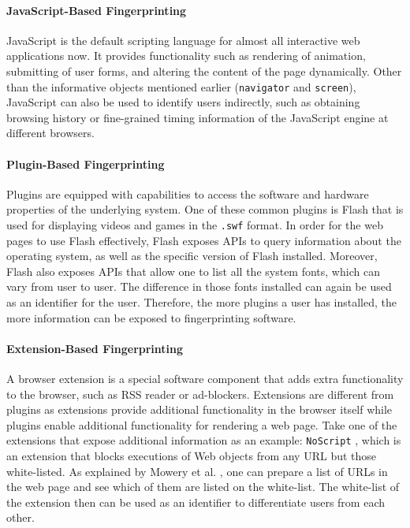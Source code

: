 \documentclass{acm_proc_article-sp}
\begin{document}
\paragraph{JavaScript-Based Fingerprinting}
JavaScript is the default scripting language for almost all interactive web applications now. It provides functionality such as rendering of animation, submitting of user forms, and altering the content of the page dynamically. 
Other than the informative objects mentioned earlier (\verb|navigator| and \verb|screen|), JavaScript can also be used to identify users indirectly, such as obtaining browsing history or fine-grained timing information of the JavaScript engine at different browsers.

\paragraph{Plugin-Based Fingerprinting}
Plugins are equipped with capabilities to access the software and hardware properties of the underlying system. One of these common plugins is Flash that is used for displaying videos and games in the \verb|.swf| format. In order for the web pages to use Flash effectively, Flash exposes APIs to query information about the operating system, as well as the specific version of Flash installed.
Moreover, Flash also exposes APIs that allow one to list all the system fonts, which can vary from user to user. The difference in those fonts installed can again be used as an identifier for the user.
Therefore, the more plugins a user has installed, the more information can be exposed to fingerprinting software.

\paragraph{Extension-Based Fingerprinting}
A browser extension is a special software component that adds extra functionality to the browser, such as RSS reader or ad-blockers. Extensions are different from plugins as extensions provide additional functionality in the browser itself while plugins enable additional functionality for rendering a web page. Take one of the extensions that expose additional
information as an example: \verb|NoScript| \cite{noscript}, which is an extension that blocks executions of Web objects from any URL but those white-listed. As explained by Mowery et al. \cite{mowery:fg}, one can prepare a list of URLs in the web page and see which of them are listed on the white-list. The white-list of the extension then can be used as an identifier to differentiate users from each other.
\end{document}
